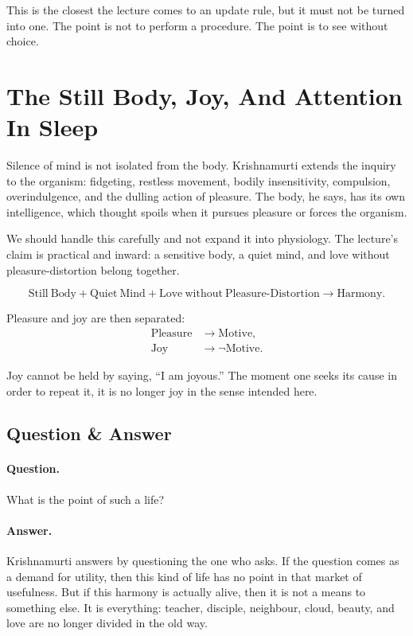 This is the closest the lecture comes to an update rule, but it must not be turned into one. The point is not to perform a procedure. The point is to see without choice.

\section{The Still Body, Joy, And Attention In Sleep}

Silence of mind is not isolated from the body. Krishnamurti extends the inquiry to the organism: fidgeting, restless movement, bodily insensitivity, compulsion, overindulgence, and the dulling action of pleasure. The body, he says, has its own intelligence, which thought spoils when it pursues pleasure or forces the organism.

We should handle this carefully and not expand it into physiology. The lecture's claim is practical and inward: a sensitive body, a quiet mind, and love without pleasure-distortion belong together.

\begin{equation}
\mathrm{Still\ Body}
+
\mathrm{Quiet\ Mind}
+
\mathrm{Love\ without\ Pleasure\text{-}Distortion}
\longrightarrow
\mathrm{Harmony}.
\end{equation}

Pleasure and joy are then separated:
\begin{align}
\mathrm{Pleasure} &\longrightarrow \mathrm{Motive},\\
\mathrm{Joy} &\longrightarrow \neg \mathrm{Motive}.
\end{align}

Joy cannot be held by saying, ``I am joyous.'' The moment one seeks its cause in order to repeat it, it is no longer joy in the sense intended here.

\subsection{Question \& Answer}

\paragraph{Question.}
What is the point of such a life?

\paragraph{Answer.}
Krishnamurti answers by questioning the one who asks. If the question comes as a demand for utility, then this kind of life has no point in that market of usefulness. But if this harmony is actually alive, then it is not a means to something else. It is everything: teacher, disciple, neighbour, cloud, beauty, and love are no longer divided in the old way.


